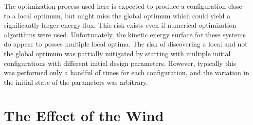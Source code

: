 %
%

The optimization process used here is expected to produce a configuration 
close to a local optimum, but might miss the global optimum 
which could yield a significantly larger energy flux. This risk exists
even if numerical optimization algorithms were used. Unfortunately, the
kinetic energy surface for these systems do appear to posses multiple
local optima.
The risk of discovering a local 
and not the global optimum was partially mitigated by starting
with multiple initial configurations with different initial
design parameters. However, typically this was performed only a handful of
times for each configuration, and the variation in the initial state of
the parameters was arbitrary. 

\section{The Effect of the Wind}
\label{sec:wind_impact}


